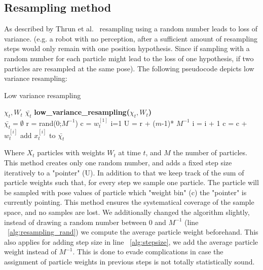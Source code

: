 \documentclass[	DIV=calc,%
							paper=a4,%
							fontsize=9pt,%
							twocolumn]{scrartcl}	 					%
\begin{document}
\subsection{Resampling method}
As described by Thrun et al.~\cite{ProbabilisticRobotics} resampling using a random number leads to loss of variance. (e.g. a robot with no perception, after a sufficient amount of resampling steps would only remain with one position hypothesis. Since if sampling with a random number for each particle might lead to the loss of one hypothesis, if two particles are resampled at the same pose).
The following pseudocode depicts low variance resampling:\\
\begin{algorithm}[h!]
\caption{Low variance resampling}
\begin{algorithmic}[1]
$\chi_{t},W_t $
$\bar{\chi_t}$
\STATE \textbf{low\_variance\_resampling(}$\chi_{t},W_t$\textbf{)}\\
\STATE  $\bar{\chi_t} =  \emptyset$
\STATE r = rand(0;$M^{-1}$)\label{alg:resampling_rand}
\STATE c = $w^{[1]}_t$
\STATE  i=1
\STATE U = r + ($m$-1)* $M^{-1}$\label{alg:stepsize}
\STATE i = i + 1\;
\STATE c = c + $w^{[i]}_t$
\ENDWHILE
\STATE  add $x^{[i]}_t$ to $\bar{\chi_t}$
\ENDFOR
\end{algorithmic}
\end{algorithm}

Where $X_t$ particles with weights $W_t$ at time $t$, and $M$ the number of particles.
This method creates only one random number, and adds a fixed step size iteratively to a "pointer" (U).
In addition to that we keep track of the sum of particle weights such that, for every step we sample one particle. The particle will be sampled with pose values of particle which "weight bin" (c) the "pointer" is currently pointing. 
This method ensures the systematical coverage of the sample space, and no samples are lost.
We additionally changed the algorithm slightly, instead of drawing a random number between 0 and $M^{-1}$ (line ~\ref{alg:resampling_rand}) we compute the average particle weight beforehand. This also applies for adding step size in line ~\ref{alg:stepsize}, we add the average particle weight instead of $M^{-1}$. This is done to evade complications in case the assignment of particle weights in previous steps is not totally statistically sound.
\end{document}

